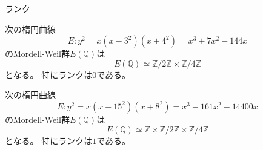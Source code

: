 \documentclass{classes/mybeamer}
\begin{document}
\begin{frame}{ランク}
    \begin{thm}[$(a,b,c)=(3,4,5)$]\rm
        \label{eg:3-4-5}
        次の楕円曲線
        \begin{equation}
            E: y^2 = x (x-3^2) (x+4^2) = x^3 + 7 x^2 - 144 x
        \end{equation}
        のMordell-Weil群$E(\mathbb{Q})$は
        \begin{equation}
            E(\mathbb{Q}) \simeq \mathbb{Z}/2\mathbb{Z} \times \mathbb{Z}/4\mathbb{Z}
        \end{equation}
        となる。
        特にランクは$0$である。
    \end{thm}
    \begin{thm}[$(a,b,c)=(15,8,17)$]\rm
        \label{eg:15-8-17}
        次の楕円曲線
        \begin{equation}
            E: y^2 = x (x-15^2) (x+8^2) = x^3 -161 x^2 - 14400 x
        \end{equation}
        のMordell-Weil群$E(\mathbb{Q})$は
        \begin{equation}
            E(\mathbb{Q}) \simeq \mathbb{Z} \times \mathbb{Z}/2\mathbb{Z} \times \mathbb{Z}/4\mathbb{Z}
        \end{equation}
        となる。
        特にランクは$1$である。
    \end{thm}
\end{frame}
\end{document}
